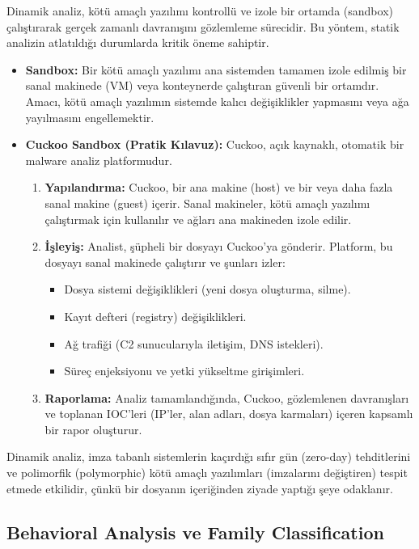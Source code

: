 Dinamik analiz, kötü amaçlı yazılımı kontrollü ve izole bir ortamda (sandbox) çalıştırarak gerçek zamanlı davranışını gözlemleme sürecidir. Bu yöntem, statik analizin atlatıldığı durumlarda kritik öneme sahiptir.

\begin{itemize}
    \item \textbf{Sandbox:} Bir kötü amaçlı yazılımı ana sistemden tamamen izole edilmiş bir sanal makinede (VM) veya konteynerde çalıştıran güvenli bir ortamdır. Amacı, kötü amaçlı yazılımın sistemde kalıcı değişiklikler yapmasını veya ağa yayılmasını engellemektir.
    \item \textbf{Cuckoo Sandbox (Pratik Kılavuz):} Cuckoo, açık kaynaklı, otomatik bir malware analiz platformudur.
    \begin{enumerate}
        \item \textbf{Yapılandırma:} Cuckoo, bir ana makine (host) ve bir veya daha fazla sanal makine (guest) içerir. Sanal makineler, kötü amaçlı yazılımı çalıştırmak için kullanılır ve ağları ana makineden izole edilir.
        \item \textbf{İşleyiş:} Analist, şüpheli bir dosyayı Cuckoo'ya gönderir. Platform, bu dosyayı sanal makinede çalıştırır ve şunları izler:
        \begin{itemize}
            \item Dosya sistemi değişiklikleri (yeni dosya oluşturma, silme).
            \item Kayıt defteri (registry) değişiklikleri.
            \item Ağ trafiği (C2 sunucularıyla iletişim, DNS istekleri).
            \item Süreç enjeksiyonu ve yetki yükseltme girişimleri.
        \end{itemize}
        \item \textbf{Raporlama:} Analiz tamamlandığında, Cuckoo, gözlemlenen davranışları ve toplanan IOC'leri (IP'ler, alan adları, dosya karmaları) içeren kapsamlı bir rapor oluşturur.
    \end{enumerate}
\end{itemize}

Dinamik analiz, imza tabanlı sistemlerin kaçırdığı sıfır gün (zero-day) tehditlerini ve polimorfik (polymorphic) kötü amaçlı yazılımları (imzalarını değiştiren) tespit etmede etkilidir, çünkü bir dosyanın içeriğinden ziyade yaptığı şeye odaklanır.

\subsection{Behavioral Analysis ve Family Classification}

